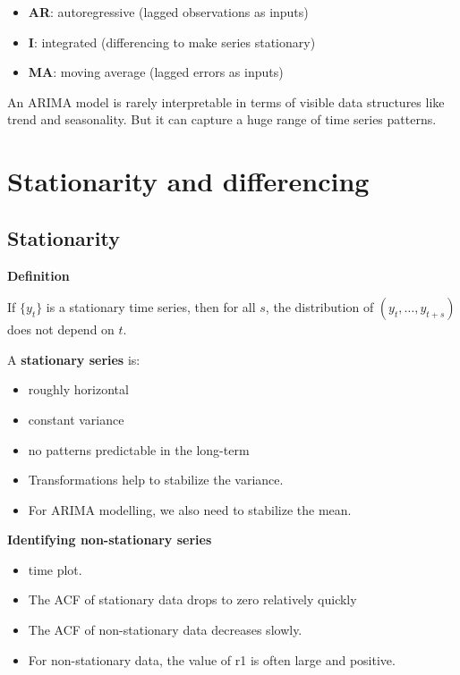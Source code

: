 \documentclass[]{book}
\providecommand{\tightlist}{%
  \setlength{\itemsep}{0pt}\setlength{\parskip}{0pt}}
\begin{document}

\begin{itemize}
\tightlist
\item
  \textbf{AR}: autoregressive (lagged observations as inputs)
\item
  \textbf{I}: integrated (differencing to make series stationary)
\item
  \textbf{MA}: moving average (lagged errors as inputs)
\end{itemize}

An ARIMA model is rarely interpretable in terms of visible data structures like trend and seasonality. But it can capture a huge range of time series patterns.

\hypertarget{stationarity-and-differencing}{%
\section{Stationarity and differencing}\label{stationarity-and-differencing}}

\hypertarget{stationarity}{%
\subsection{Stationarity}\label{stationarity}}

\textbf{Definition}

If \(\{y_t\}\) is a stationary time series, then for all \(s\), the distribution of \((y_t,\dots,y_{t+s})\) does not depend on \(t\).

A \textbf{stationary series} is:

\begin{itemize}
\item
  roughly horizontal
\item
  constant variance
\item
  no patterns predictable in the long-term
\item
  Transformations help to stabilize the variance.
\item
  For ARIMA modelling, we also need to stabilize the mean.
\end{itemize}

\newpage

\textbf{Identifying non-stationary series}

\begin{itemize}
\tightlist
\item
  time plot.
\item
  The ACF of stationary data drops to zero relatively quickly
\item
  The ACF of non-stationary data decreases slowly.
\item
  For non-stationary data, the value of r1 is often large and positive.
\end{itemize}
\end{document}
